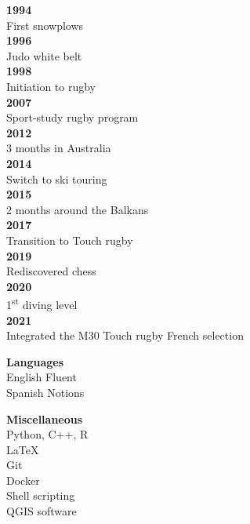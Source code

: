 \documentclass{article}
\begin{document}
\begin{minipage}{0.15\textwidth}
    \begin{minipage}{1\textwidth}
    \begin{flushleft}
        \textbf{1994} \\
        First snowplows \\[.2cm]
        \textbf{1996} \\
        Judo white belt \\[.2cm]
        \textbf{1998} \\
        Initiation to rugby \\[.9cm]
        \textbf{2007} \\
        Sport-study rugby program \\[.5cm]
        \textbf{2012} \\
        3 months in Australia \\[.2cm]
        \textbf{2014} \\
        Switch to ski touring \\[.1cm]
        \textbf{2015} \\
        2 months around the Balkans \\[.2cm]
        \textbf{2017} \\
        Transition to Touch rugby \\[.2cm]
        \textbf{2019} \\
        Rediscovered chess \\[.1cm]
        \textbf{2020} \\
        1\textsuperscript{st} diving level \\[.1cm]
        \textbf{2021} \\
        Integrated the M30 Touch rugby French selection
    \end{flushleft}
    \end{minipage}
    \begin{minipage}{1\textwidth}
    \vspace{7.9cm}
    \begin{flushleft}
        \textbf{Languages} \\[.1cm]
        English \quad Fluent \\
        Spanish \quad Notions
    \end{flushleft}
    \end{minipage}
    \begin{minipage}{1\textwidth}
    \vspace{1cm}
    \begin{flushleft}
        \textbf{Miscellaneous} \\[.1cm]
        Python, C++, R \\
        \LaTeX \\
        Git \\
        Docker \\
        Shell scripting \\
        QGIS software
    \end{flushleft}
    \end{minipage}
\begin{flushleft}
    
\end{flushleft}
\end{minipage}
\end{document}
